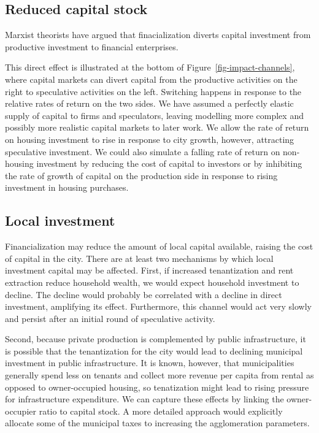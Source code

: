 \subsection{Reduced capital stock}

Marxist theorists \cite{lefebvreRevolutionUrbaine1970, harveyClassmonopolyRentFinance1974, harveyUrbanProcessCapitalism1978, christophersRevisitingUrbanizationCapital2011} have argued that finacialization diverts capital investment from productive investment to financial enterprises. 

This direct effect is illustrated at the bottom of Figure~\ref{fig-impact-channels}, where capital markets can divert capital from the productive activities on the right to speculative activities on the left.  Switching happens in response to the relative rates of return on the two sides. We have assumed a perfectly elastic supply of capital to firms and speculators, leaving modelling more complex and possibly more realistic capital markets to later work.  We allow the rate of return on housing investment to rise in response to city growth, however, attracting speculative investment. We could also simulate a falling rate of return on non-housing investment by reducing the cost of capital to investors or by inhibiting the rate of growth of capital on the production side in response to rising investment in housing purchases. %


\subsection{Local investment}

Financialization may reduce the amount of local capital available, raising the cost of capital in the city. 
There are at least two mechanisms by which local investment capital may be affected. First, if increased tenantization and rent extraction reduce household wealth, we would expect household investment to decline. The decline would probably be correlated with a decline in direct investment, amplifying its effect. Furthermore, this channel would act very slowly and persist after an initial round of speculative activity. 

Second, because private production is complemented by public infrastructure, it is possible that the tenantization for the city would lead to declining municipal investment in public infrastructure. It is known, however, that municipalities generally spend less on tenants and collect more revenue per capita from rental as opposed to owner-occupied housing, so tenatization might lead to rising pressure for infrastructure expenditure.  We can capture these effects by linking the owner-occupier ratio to capital stock. A more detailed approach would explicitly allocate some of the municipal taxes to increasing the agglomeration parameters.


